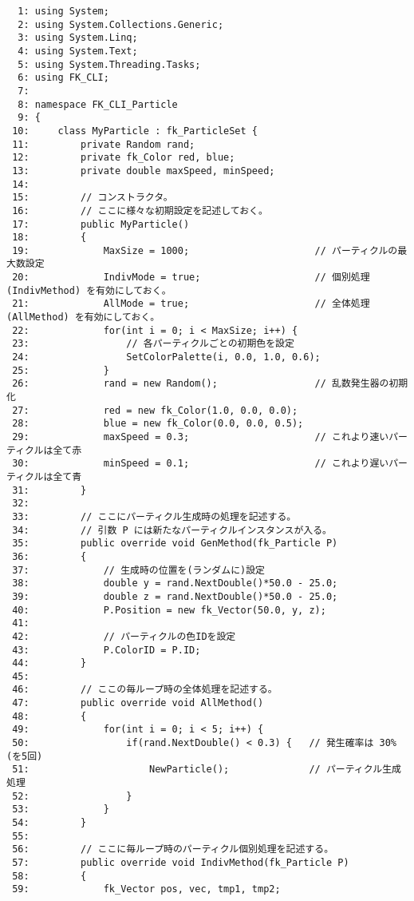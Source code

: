 \begin{breakbox}
\begin{small}
\begin{verbatim}
  1: using System;
  2: using System.Collections.Generic;
  3: using System.Linq;
  4: using System.Text;
  5: using System.Threading.Tasks;
  6: using FK_CLI;
  7: 
  8: namespace FK_CLI_Particle
  9: {
 10:     class MyParticle : fk_ParticleSet {
 11:         private Random rand;
 12:         private fk_Color red, blue;
 13:         private double maxSpeed, minSpeed;
 14: 
 15:         // コンストラクタ。
 16:         // ここに様々な初期設定を記述しておく。
 17:         public MyParticle()
 18:         {
 19:             MaxSize = 1000;                      // パーティクルの最大数設定
 20:             IndivMode = true;                    // 個別処理 (IndivMethod) を有効にしておく。
 21:             AllMode = true;                      // 全体処理 (AllMethod) を有効にしておく。
 22:             for(int i = 0; i < MaxSize; i++) {
 23:                 // 各パーティクルごとの初期色を設定
 24:                 SetColorPalette(i, 0.0, 1.0, 0.6);
 25:             }
 26:             rand = new Random();                 // 乱数発生器の初期化
 27:             red = new fk_Color(1.0, 0.0, 0.0);
 28:             blue = new fk_Color(0.0, 0.0, 0.5);
 29:             maxSpeed = 0.3;                      // これより速いパーティクルは全て赤
 30:             minSpeed = 0.1;                      // これより遅いパーティクルは全て青
 31:         }
 32:         
 33:         // ここにパーティクル生成時の処理を記述する。
 34:         // 引数 P には新たなパーティクルインスタンスが入る。
 35:         public override void GenMethod(fk_Particle P)
 36:         {
 37:             // 生成時の位置を(ランダムに)設定
 38:             double y = rand.NextDouble()*50.0 - 25.0;
 39:             double z = rand.NextDouble()*50.0 - 25.0;
 40:             P.Position = new fk_Vector(50.0, y, z);
 41: 
 42:             // パーティクルの色IDを設定
 43:             P.ColorID = P.ID;
 44:         }
 45: 
 46:         // ここの毎ループ時の全体処理を記述する。
 47:         public override void AllMethod()
 48:         {
 49:             for(int i = 0; i < 5; i++) {
 50:                 if(rand.NextDouble() < 0.3) {   // 発生確率は 30% (を5回)
 51:                     NewParticle();              // パーティクル生成処理
 52:                 }
 53:             }
 54:         }
 55: 
 56:         // ここに毎ループ時のパーティクル個別処理を記述する。
 57:         public override void IndivMethod(fk_Particle P)
 58:         {
 59:             fk_Vector pos, vec, tmp1, tmp2;

\end{verbatim}
\end{small}
\end{breakbox}
